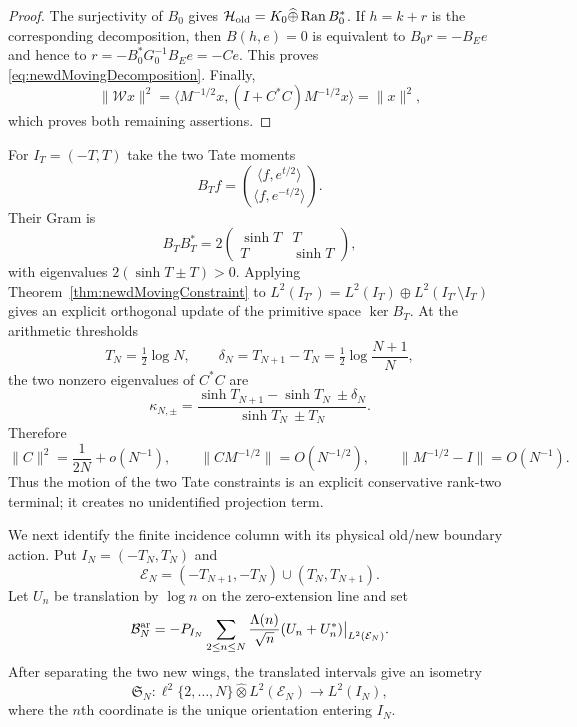 \documentclass[11pt]{amsart}
\theoremstyle{definition}
\theoremstyle{remark}
\begin{document}
\begin{proof}
The surjectivity of $B_0$ gives
$\mathcal H_{\rm old}=K_0\widehat\oplus\operatorname{Ran} B_0^*$.  If $h=k+r$ is the corresponding
decomposition, then $B(h,e)=0$ is equivalent to $B_0r=-B_Ee$ and hence to
$r=-B_0^*G_0^{-1}B_Ee=-Ce$.  This proves
\eqref{eq:newdMovingDecomposition}.  Finally,
\[
 \|\mathcal Wx\|^2
 =\langle M^{-1/2}x,(I+C^*C)M^{-1/2}x\rangle=\|x\|^2,
\]
which proves both remaining assertions.
\end{proof}

For $I_T=(-T,T)$ take the two Tate moments
\begin{equation}\label{eq:newdTateMomentMap}
 B_Tf=
 \binom{\langle f,e^{t/2}\rangle}{\langle f,e^{-t/2}\rangle}.
\end{equation}
Their Gram is
\begin{equation}\label{eq:newdTateGram}
 B_TB_T^*=2
 \begin{pmatrix}\sinh T&T\\T&\sinh T\end{pmatrix},
\end{equation}
with eigenvalues $2(\sinh T\pm T)>0$.  Applying
Theorem~\ref{thm:newdMovingConstraint} to
$L^2(I_{T'})=L^2(I_T)\oplus L^2(I_{T'}\setminus I_T)$ gives an explicit
orthogonal update of the primitive space $\ker B_T$.  At the arithmetic
thresholds
\[
 T_N=\tfrac12\log N,
 \qquad
 \delta_N=T_{N+1}-T_N=\tfrac12\log\frac{N+1}{N},
\]
the two nonzero eigenvalues of $C^*C$ are
\begin{equation}\label{eq:newdTateReturnEigenvalues}
 \kappa_{N,\pm}=
 \frac{\sinh T_{N+1}-\sinh T_N\ \pm\delta_N}
      {\sinh T_N\ \pm T_N}.
\end{equation}
Therefore
\begin{equation}\label{eq:newdTateReturnDecay}
 \|C\|^2=\frac1{2N}+o(N^{-1}),
 \qquad
 \|CM^{-1/2}\|=O(N^{-1/2}),
 \qquad
 \|M^{-1/2}-I\|=O(N^{-1}).
\end{equation}
Thus the motion of the two Tate constraints is an explicit conservative
rank-two terminal; it creates no unidentified projection term.

We next identify the finite incidence column with its physical
old/new boundary action.  Put $I_N=(-T_N,T_N)$ and
\[
 \mathcal E_N=
 (-T_{N+1},-T_N)\cup(T_N,T_{N+1}).
\]
Let $U_n$ be translation by $\log n$ on the zero-extension line and set
\begin{equation}\label{eq:newdPhysicalIncidence}
 \mathcal B_N^{\rm ar}
 =-P_{I_N}\sum_{2\leq n\leq N}
       \frac{\Lambda(n)}{\sqrt n}(U_n+U_n^*)
       \big|_{L^2(\mathcal E_N)}.
\end{equation}
After separating the two new wings, the translated intervals give an
isometry
\[
 \mathfrak S_N:
 \ell^2\{2,\ldots,N\}\widehat\otimes L^2(\mathcal E_N)
 \longrightarrow L^2(I_N),
\]
where the $n$th coordinate is the unique orientation entering $I_N$.
\end{document}
